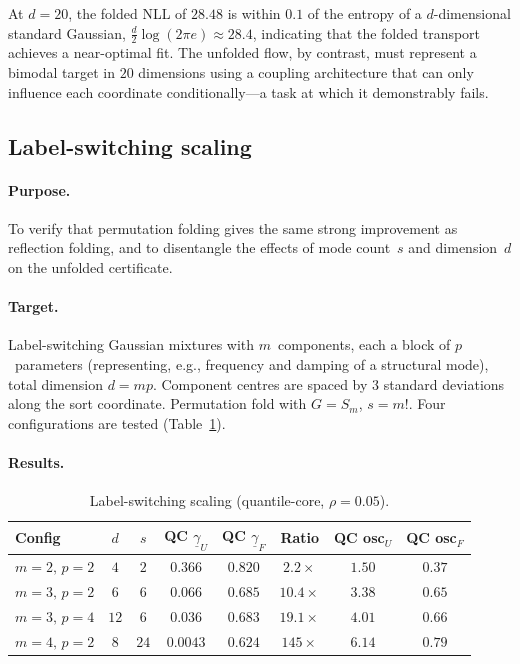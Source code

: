 At $d = 20$, the folded NLL of $28.48$ is within $0.1$ of the
entropy of a $d$-dimensional standard Gaussian,
$\tfrac{d}{2}\log(2\pi e) \approx 28.4$, indicating that the
folded transport achieves a near-optimal fit.
The unfolded flow, by contrast, must represent a bimodal target in
$20$ dimensions using a coupling architecture that can only
influence each coordinate conditionally---a task at which it
demonstrably fails.


\subsection{Label-switching scaling}
\label{sec:exp_labelswitching}

\paragraph{Purpose.}
To verify that permutation folding gives the same strong
improvement as reflection folding, and to disentangle the effects
of mode count~$s$ and dimension~$d$ on the unfolded certificate.

\paragraph{Target.}
Label-switching Gaussian mixtures with $m$~components, each a
block of $p$~parameters (representing, e.g., frequency and damping
of a structural mode), total dimension $d = mp$.  Component centres
are spaced by $3$ standard deviations along the sort coordinate.
Permutation fold with $G = S_m$, $s = m!$.  Four configurations
are tested (Table~\ref{tab:labelswitching}).

\paragraph{Results.}

\begin{table}[t]
\centering
\caption{Label-switching scaling (quantile-core, $\rho = 0.05$).}
\label{tab:labelswitching}
\smallskip
\begin{tabular}{lccccccc}
\hline
Config & $d$ & $s$ & QC $\underline{\gamma}_U$ & QC $\underline{\gamma}_F$
       & Ratio & QC osc$_U$ & QC osc$_F$ \\
\hline
$m{=}2,\,p{=}2$ & $4$  & $2$   & $0.366$ & $0.820$ & $2.2\times$   & $1.50$ & $0.37$ \\
$m{=}3,\,p{=}2$ & $6$  & $6$   & $0.066$ & $0.685$ & $10.4\times$  & $3.38$ & $0.65$ \\
$m{=}3,\,p{=}4$ & $12$ & $6$   & $0.036$ & $0.683$ & $19.1\times$  & $4.01$ & $0.66$ \\
$m{=}4,\,p{=}2$ & $8$  & $24$  & $0.0043$ & $0.624$ & $145\times$   & $6.14$ & $0.79$ \\
\hline
\end{tabular}
\end{table}

